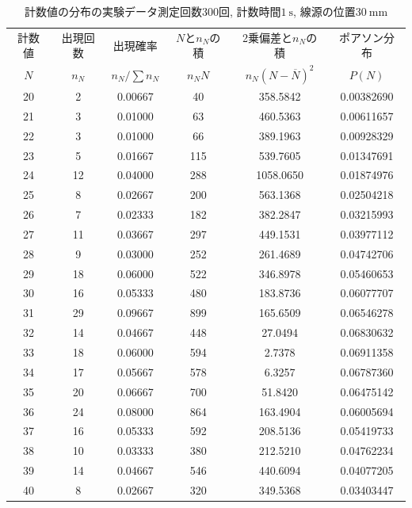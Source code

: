 \documentclass{jarticle}
\begin{document}
\begin{table}[H]
  \caption{計数値の分布の実験データ\protect\linebreak 測定回数$300$回, 計数時間$1\ \mathrm{s}$, 線源の位置$30\ \mathrm{mm}$}
  \label{tb:count-distribution-30mm-300times}
  \hspace{-1cm}
  \begin{tabular}{cccccc}
    \hline
    計数値 & 出現回数 & 出現確率 & $N$と$n_N$の積 & 2乗偏差と$n_N$の積 & ポアソン分布 \\
    $N$ & $n_N$ & $n_N/\sum n_N$ & $n_N N$ & $n_N(N-\overline{N})^2$ & $P(N)$ \\
    \hline
    20 & 2 & 0.00667 & 40 & 358.5842 & 0.00382690 \\
    21 & 3 & 0.01000 & 63 & 460.5363 & 0.00611657 \\
    22 & 3 & 0.01000 & 66 & 389.1963 & 0.00928329 \\
    23 & 5 & 0.01667 & 115 & 539.7605 & 0.01347691 \\
    24 & 12 & 0.04000 & 288 & 1058.0650 & 0.01874976 \\
    25 & 8 & 0.02667 & 200 & 563.1368 & 0.02504218 \\
    26 & 7 & 0.02333 & 182 & 382.2847 & 0.03215993 \\
    27 & 11 & 0.03667 & 297 & 449.1531 & 0.03977112 \\
    28 & 9 & 0.03000 & 252 & 261.4689 & 0.04742706 \\
    29 & 18 & 0.06000 & 522 & 346.8978 & 0.05460653 \\
    30 & 16 & 0.05333 & 480 & 183.8736 & 0.06077707 \\
    31 & 29 & 0.09667 & 899 & 165.6509 & 0.06546278 \\
    32 & 14 & 0.04667 & 448 & 27.0494 & 0.06830632 \\
    33 & 18 & 0.06000 & 594 & 2.7378 & 0.06911358 \\
    34 & 17 & 0.05667 & 578 & 6.3257 & 0.06787360 \\
    35 & 20 & 0.06667 & 700 & 51.8420 & 0.06475142 \\
    36 & 24 & 0.08000 & 864 & 163.4904 & 0.06005694 \\
    37 & 16 & 0.05333 & 592 & 208.5136 & 0.05419733 \\
    38 & 10 & 0.03333 & 380 & 212.5210 & 0.04762234 \\
    39 & 14 & 0.04667 & 546 & 440.6094 & 0.04077205 \\
    40 & 8 & 0.02667 & 320 & 349.5368 & 0.03403447 \\

\end{tabular}
\end{table}
\end{document}
